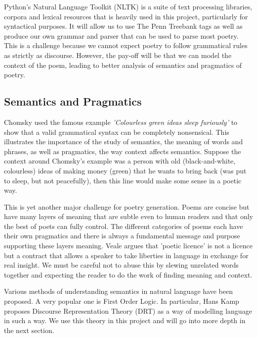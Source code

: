 Python's Natural Language Toolkit (NLTK)\cite{bird2009natural} is a suite of text processing libraries, corpora and lexical resources that is heavily used in this project, particularly for syntactical purposes. It will allow us to use The Penn Treebank tags as well as produce our own grammar and parser that can be used to parse most poetry. This is a challenge because we cannot expect poetry to follow grammatical rules as strictly as discourse. However, the pay-off will be that we can model the context of the poem, leading to better analysis of semantics and pragmatics of poetry.

\subsection{Semantics and Pragmatics}
Chomsky used the famous example \textit{'Colourless green ideas sleep furiously'} to show that a valid grammatical syntax can be completely nonsensical\cite{chomsky2002syntactic}. This illustrates the importance of the study of semantics, the meaning of words and phrases, as well as pragmatics, the way context affects semantics. Suppose the context around Chomsky's example was a person with old (black-and-white, colourless) ideas of making money (green) that he wants to bring back (was put to sleep, but not peacefully), then this line would make some sense in a poetic way.

This is yet another major challenge for poetry generation. Poems are concise but have many layers of meaning that are subtle even to human readers and that only the best of poets can fully control. The different categories of poems each have their own pragmatics and there is always a fundamental message and purpose supporting these layers meaning. Veale argues that 'poetic licence' is not a licence but a contract that allows a speaker to take liberties in language in exchange for real insight\cite{veale2013less}. We must be careful not to abuse this by slewing unrelated words together and expecting the reader to do the work of finding meaning and context.

Various methods of understanding semantics in natural language have been proposed. A very popular one is First Order Logic. In particular, Hans Kamp proposes Discourse Representation Theory (DRT) as a way of modelling language in such a way. We use this theory in this project and will go into more depth in the next section.

